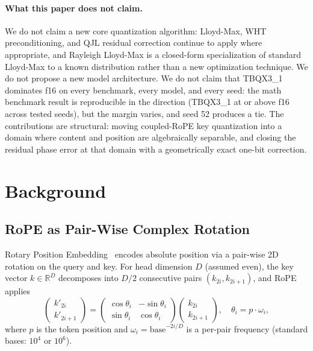 \documentclass[10pt,twocolumn]{article}
\begin{document}
\paragraph{What this paper does not claim.}
We do not claim a new core quantization algorithm: Lloyd-Max, WHT preconditioning, and QJL residual correction continue to apply where appropriate, and Rayleigh Lloyd-Max is a closed-form specialization of standard Lloyd-Max to a known distribution rather than a new optimization technique. We do not propose a new model architecture. We do not claim that TBQX3\_1 dominates f16 on every benchmark, every model, and every seed: the math benchmark result is reproducible in the direction (TBQX3\_1 at or above f16 across tested seeds), but the margin varies, and seed 52 produces a tie. The contributions are structural: moving coupled-RoPE key quantization into a domain where content and position are algebraically separable, and closing the residual phase error at that domain with a geometrically exact one-bit correction.

\section{Background}
\label{sec:background}

\subsection{RoPE as Pair-Wise Complex Rotation}
\label{sec:rope-bg}

Rotary Position Embedding~\cite{rope2021} encodes absolute position via a pair-wise 2D rotation on the query and key. For head dimension $D$ (assumed even), the key vector $k\in\mathbb{R}^D$ decomposes into $D/2$ consecutive pairs $(k_{2i},k_{2i+1})$, and RoPE applies
\begin{equation}
  \begin{pmatrix} k'_{2i}\\k'_{2i+1}\end{pmatrix}
  =
  \begin{pmatrix} \cos\theta_i & -\sin\theta_i\\ \sin\theta_i & \cos\theta_i\end{pmatrix}
  \begin{pmatrix} k_{2i}\\k_{2i+1}\end{pmatrix},\quad
  \theta_i=p\cdot\omega_i,
  \label{eq:rope}
\end{equation}
where $p$ is the token position and $\omega_i=\text{base}^{-2i/D}$ is a per-pair frequency (standard bases: $10^4$ or $10^6$).
\end{document}
